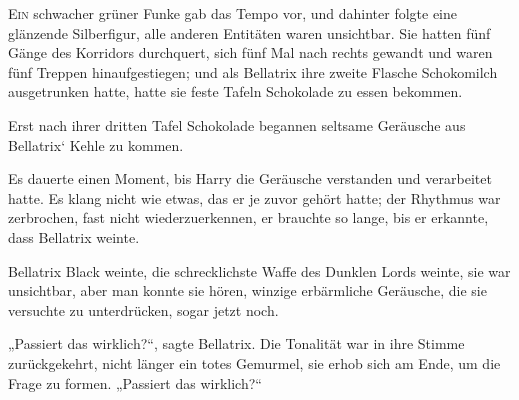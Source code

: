 
\lettrine{E}{in} schwacher grüner Funke gab das Tempo vor, und dahinter folgte eine glänzende Silberfigur, alle anderen Entitäten waren unsichtbar. Sie hatten fünf Gänge des Korridors durchquert, sich fünf Mal nach rechts gewandt und waren fünf Treppen hinaufgestiegen; und als Bellatrix ihre zweite Flasche Schokomilch ausgetrunken hatte, hatte sie feste Tafeln Schokolade zu essen bekommen.

Erst nach ihrer dritten Tafel Schokolade begannen seltsame Geräusche aus Bellatrix‘ Kehle zu kommen.

Es dauerte einen Moment, bis Harry die Geräusche verstanden und verarbeitet hatte. Es klang nicht wie etwas, das er je zuvor gehört hatte; der Rhythmus war zerbrochen, fast nicht wiederzuerkennen, er brauchte so lange, bis er erkannte, dass Bellatrix weinte.

Bellatrix Black weinte, die schrecklichste Waffe des Dunklen Lords weinte, sie war unsichtbar, aber man konnte sie hören, winzige erbärmliche Geräusche, die sie versuchte zu unterdrücken, sogar jetzt noch.

„Passiert das wirklich?“, sagte Bellatrix. Die Tonalität war in ihre Stimme zurückgekehrt, nicht länger ein totes Gemurmel, sie erhob sich am Ende, um die Frage zu formen. „Passiert das wirklich?“

